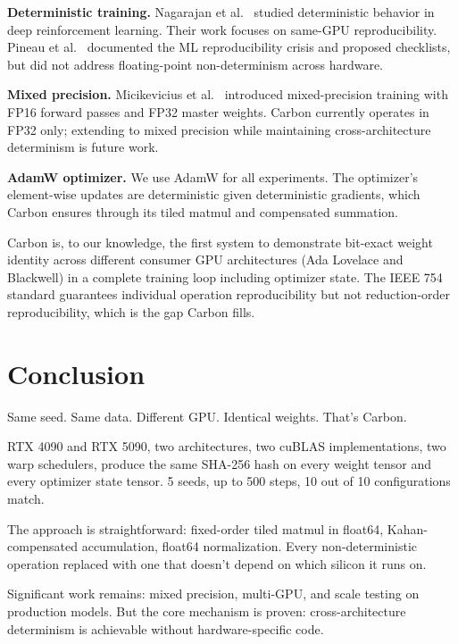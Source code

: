 \documentclass[11pt,a4paper]{article}
\begin{document}
\textbf{Deterministic training.}
Nagarajan et al.\ \cite{nagarajan2019deterministic} studied deterministic
behavior in deep reinforcement learning. Their work focuses on
same-GPU reproducibility. Pineau et al.\ \cite{pineau2021improving}
documented the ML reproducibility crisis and proposed checklists,
but did not address floating-point non-determinism across hardware.

\textbf{Mixed precision.}
Micikevicius et al.\ \cite{micikevicius2018mixed} introduced mixed-precision
training with FP16 forward passes and FP32 master weights. Carbon
currently operates in FP32 only; extending to mixed precision
while maintaining cross-architecture determinism is future work.

\textbf{AdamW optimizer.}
We use AdamW \cite{loshchilov2019adamw} for all experiments. The optimizer's
element-wise updates are deterministic given deterministic gradients,
which Carbon ensures through its tiled matmul and compensated summation.

Carbon is, to our knowledge, the first system to demonstrate bit-exact
weight identity across different consumer GPU architectures (Ada Lovelace
and Blackwell) in a complete training loop including optimizer state.
The IEEE 754 standard \cite{ieee754} guarantees individual operation
reproducibility but not reduction-order reproducibility, which is the
gap Carbon fills.

\section{Conclusion}

Same seed. Same data. Different GPU. Identical weights. That's Carbon.

RTX 4090 and RTX 5090, two architectures, two cuBLAS implementations,
two warp schedulers, produce the same SHA-256 hash on every weight tensor
and every optimizer state tensor. 5 seeds, up to 500 steps, 10 out of 10
configurations match.

The approach is straightforward: fixed-order tiled matmul in float64,
Kahan-compensated accumulation, float64 normalization. Every non-deterministic
operation replaced with one that doesn't depend on which silicon it runs on.

Significant work remains: mixed precision, multi-GPU, and scale testing
on production models. But the core mechanism is proven: cross-architecture
determinism is achievable without hardware-specific code.
\end{document}
